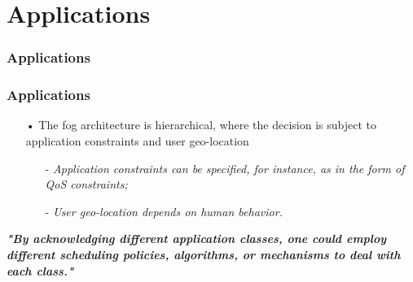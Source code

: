 \documentclass[10pt, pdf, xcolor=pdftex, dvipsnames, table]{beamer}
\begin{document}
\section[Applications]{Applications}

\begin{frame}
	\tableofcontents[currentsection]
\end{frame}

\begin{frame}
	\frametitle{Applications}
\end{frame}

\begin{frame}
	\frametitle{Applications}
 	\begin{block}{}
 		\begin{itemize}
 		    \item[•] The fog architecture is hierarchical, where the decision is subject to application constraints and user geo-location\newline
 				\begin{itemize}
 		    		\item[-] \footnotesize\textit{Application constraints can be specified, for instance, as in the form of QoS constraints;}\newline
 		    		\item[-] \footnotesize\textit{User geo-location depends on human behavior.}
 		    	\end{itemize}
 		\end{itemize}
 	\end{block}
 	\footnotesize\textit{\textbf{"By acknowledging different application classes, one could employ different scheduling policies, algorithms, or mechanisms to deal with each class."}}
\end{frame}
\end{document}
